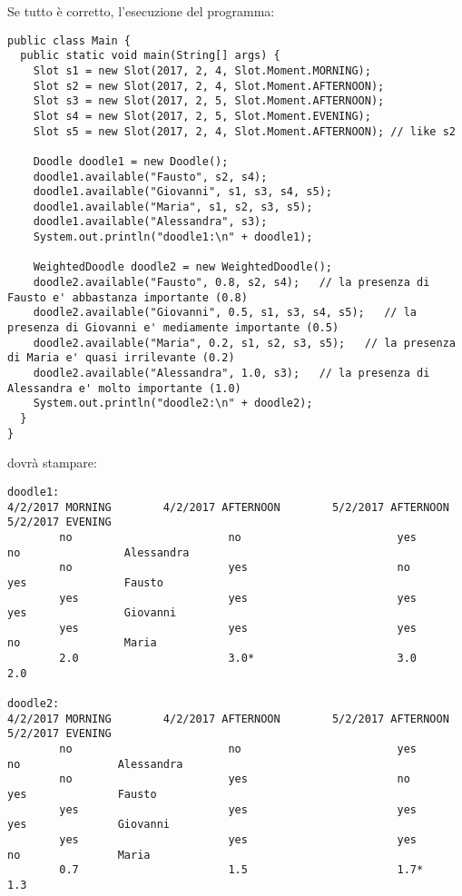 \documentclass{article}[10pt]
\begin{document}
Se tutto \`e corretto, l'esecuzione del programma:
{\scriptsize\begin{verbatim}
public class Main {
  public static void main(String[] args) {
    Slot s1 = new Slot(2017, 2, 4, Slot.Moment.MORNING);
    Slot s2 = new Slot(2017, 2, 4, Slot.Moment.AFTERNOON);
    Slot s3 = new Slot(2017, 2, 5, Slot.Moment.AFTERNOON);
    Slot s4 = new Slot(2017, 2, 5, Slot.Moment.EVENING);
    Slot s5 = new Slot(2017, 2, 4, Slot.Moment.AFTERNOON); // like s2

    Doodle doodle1 = new Doodle();
    doodle1.available("Fausto", s2, s4);
    doodle1.available("Giovanni", s1, s3, s4, s5);
    doodle1.available("Maria", s1, s2, s3, s5);
    doodle1.available("Alessandra", s3);
    System.out.println("doodle1:\n" + doodle1);

    WeightedDoodle doodle2 = new WeightedDoodle();
    doodle2.available("Fausto", 0.8, s2, s4);   // la presenza di Fausto e' abbastanza importante (0.8)
    doodle2.available("Giovanni", 0.5, s1, s3, s4, s5);   // la presenza di Giovanni e' mediamente importante (0.5) 
    doodle2.available("Maria", 0.2, s1, s2, s3, s5);   // la presenza di Maria e' quasi irrilevante (0.2)
    doodle2.available("Alessandra", 1.0, s3);   // la presenza di Alessandra e' molto importante (1.0)
    System.out.println("doodle2:\n" + doodle2);
  }
}
\end{verbatim}}

\noindent dovr\`a stampare:

{\scriptsize\begin{verbatim}
doodle1:
4/2/2017 MORNING        4/2/2017 AFTERNOON        5/2/2017 AFTERNOON        5/2/2017 EVENING        
        no                        no                        yes                       no                Alessandra
        no                        yes                       no                        yes               Fausto
        yes                       yes                       yes                       yes               Giovanni
        yes                       yes                       yes                       no                Maria
        2.0                       3.0*                      3.0                       2.0                

doodle2:
4/2/2017 MORNING        4/2/2017 AFTERNOON        5/2/2017 AFTERNOON        5/2/2017 EVENING        
        no                        no                        yes                        no               Alessandra
        no                        yes                       no                         yes              Fausto
        yes                       yes                       yes                        yes              Giovanni
        yes                       yes                       yes                        no               Maria
        0.7                       1.5                       1.7*                       1.3                
\end{verbatim}}
\end{document}
